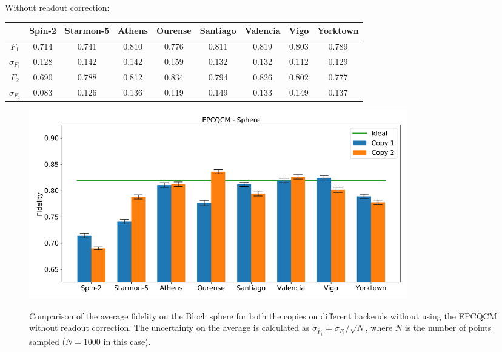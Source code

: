 Without readout correction:
\begin{table}[H]
    \centering
    \begin{tabular}{|c|c|c|c|c|c|c|c|c|}
    \hline
    \textbf{} & \textbf{Spin-2} & \textbf{Starmon-5} & \textbf{Athens} & \textbf{Ourense} & \textbf{Santiago} & \textbf{Valencia} & \textbf{Vigo} & \textbf{Yorktown} \\ \hline
    $F_1$              & 0.714  & 0.741 & 0.810 & 0.776 & 0.811 & 0.819 & 0.803 & 0.789 \\ \hline
    $\sigma_{F_1}$     & 0.128  & 0.142 & 0.142 & 0.159 & 0.132 & 0.132 & 0.112 & 0.129 \\ \hline
    $F_2$              & 0.690  & 0.788 & 0.812 & 0.834 & 0.794 & 0.826 & 0.802 & 0.777 \\ \hline
    $\sigma_{F_2}$     & 0.083  & 0.126 & 0.136 & 0.119 & 0.149 & 0.133 & 0.149 & 0.137 \\ \hline
    \end{tabular}
\end{table}
\begin{figure}[H]
  \centering
          \includegraphics[width=0.8\textwidth]{Figures/Economical/Histograms/histo_sphere.png}
      \label{fig:epc_histo_sphere_not_corrected}
      \caption{Comparison of the average fidelity on the Bloch sphere for both the copies on different backends without using the EPCQCM without readout correction. The uncertainty on the average is calculated as $\sigma_{\overline{F}_i}=\sigma_{F_i}/\sqrt{N}$, where $N$ is the number of points sampled ($N=1000$ in this case).}
\end{figure}

